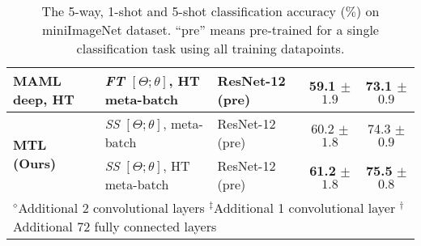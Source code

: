 \begin{table*}
\begin{tabular}{l l lcc}
    MAML deep, HT  & \emph{FT} $[\Theta; \theta]$, HT meta-batch & ResNet-12 (pre) & 59.1 $\pm$ $1.9$ & 73.1 $\pm$ $0.9$ \\
    \midrule
    \multirow{2}{*}{\textbf{MTL (Ours)}}
     & \emph{SS} $[\Theta; \theta]$, meta-batch & ResNet-12 (pre) & 60.2 $\pm$ $1.8$ & 74.3 $\pm$ $0.9$\\
     & \emph{SS} $[\Theta; \theta]$, HT meta-batch & ResNet-12 (pre) & \textbf{61.2} $\mathbf{\pm}$ $\mathbf{1.8}$ & \textbf{75.5} $\mathbf{\pm}$ $\mathbf{0.8}$\\
  \bottomrule
    \multicolumn{5}{l}{${}^{\diamond}$Additional 2 convolutional layers { } ${}^{\ddag}$Additional 1 convolutional layer { } ${}^{\dag}$Additional 72 fully connected layers}\\
\end{tabular}
  \vspace{0.2cm}
  \caption{The 5-way, 1-shot and 5-shot classification accuracy ($\%$) on miniImageNet dataset. ``pre'' means pre-trained for a single classification task using all training datapoints.}
    \label{table_mini}
\end{table*}
